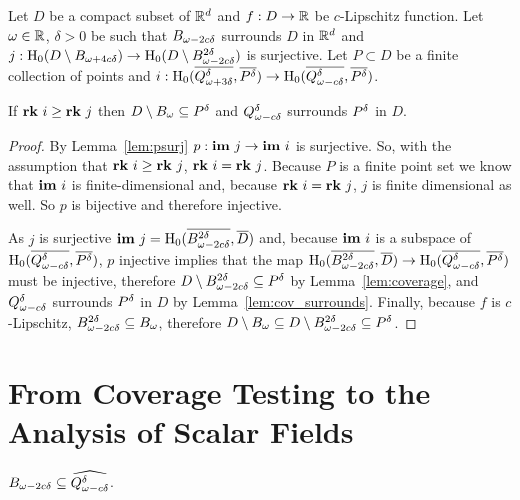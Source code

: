 \begin{theorem}
  Let $D$ be a compact subset of $\R^d$ and $f : D\to\R$ be $c$-Lipschitz function.
  Let $\omega\in\R$, $\delta > 0$ be such that $\b$ surrounds $D$ in $\R^d$ and $j : \hom_0(D\setminus \BB)\to \hom_0(D\setminus\bb)$ is surjective.
  Let $P\subset D$ be a finite collection of points and $i : \hom_0(\cmp{\QQ^\delta}, \cmp{\P})\to \hom_0(\cmp{\Q^\delta}, \cmp{\P})$.

  If $\rk~i\geq \rk~j$ then $D\setminus \B\subseteq \P$ and $\Q^\delta$ surrounds $\P$ in $D$.
\end{theorem}
\begin{proof}

  By Lemma~\ref{lem:psurj} $p :\im~j\to \im~i$ is surjective.
  So, with the assumption that $\rk~i\geq \rk~j$, $\rk~i = \rk~j$.
  Because $P$ is a finite point set we know that $\im~i$ is finite-dimensional and, because $\rk~i = \rk~j$, $j$ is finite dimensional as well.
  So $p$ is bijective and therefore injective.

  As $j$ is surjective $\im~j = \hom_0(\cmp{\bb}, \cmp{D})$ and, because $\im~i$ is a subspace of $\hom_0(\cmp{\Q^\delta}, \cmp{\P})$, $p$ injective implies that the map $\hom_0(\cmp{\bb}, \cmp{D})\to \hom_0(\cmp{\Q^\delta}, \cmp{\P})$ must be injective, therefore $D\setminus\bb\subseteq \P$ by Lemma~\ref{lem:coverage}, and $\Q^\delta$ surrounds $\P$ in $D$ by Lemma~\ref{lem:cov_surrounds}.
  Finally, because $f$ is $c$-Lipschitz, $\bb\subseteq \B$, therefore $D\setminus\B\subseteq D\setminus \bb\subseteq \P$.

\end{proof}

\clearpage

\section{From Coverage Testing to the Analysis of Scalar Fields}

\begin{lemma}
  $\b\subseteq \widehat{\Q^\of}$.
\end{lemma}

